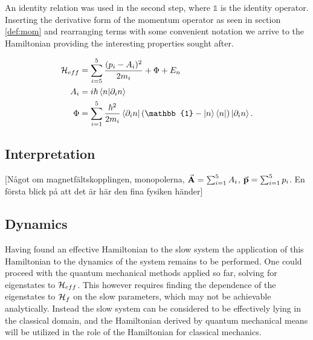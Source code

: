 \documentclass[a4paper]{article}
\begin{document}
An identity relation was used in the second step, where \(\mathbb{1}\) is the identity
operator.
Inserting the derivative form of the momentum operator as seen in section \ref{def:mom}
and rearranging terms with some convenient notation we arrive to the Hamiltonian providing the interesting properties
sought after.

\begin{align}\label{eq:Heff}
        \mathbb{\cal H}_{eff} &= \sum_{i=5}^{5} \frac{(p_i - A_i)^2}{2m_i} + \Phi + E_n\\
        A_i &= i\hbar{}\bra{n}\ket{\partial_i n}\\
        \Phi &= \sum_{i=1}^{5} \frac{\hbar{}^{2}}{2m_i}\bra{\partial_i n}(\mathbb{1} - \ket{n}
    \bra{n})\ket{\partial_i n}
.\end{align}
\subsection{Interpretation}
[Något om magnetfältskopplingen, monopolerna, \(\va{A} = \sum_{i=1}^{5} A_i\), \(\va{p} =
\sum_{i=1}^{5} p_i\). En första blick på att det är här den fina fysiken händer]
\subsection{Dynamics}
Having found an effective Hamiltonian to the slow system the application of this
Hamiltonian to the dynamics of the system remains to be performed. One could proceed with
the quantum mechanical methods applied so far, solving for eigenstates to \(\mathbb{\cal
H}_{eff}\). This however requires finding the dependence of the eigenstates to
\(\mathbb{\cal H}_f\) on the slow parameters, which may not be achievable analytically.
Instead the slow system can be considered to be effectively lying in the classical domain,
and the Hamiltonian derived by quantum mechanical means will be utilized in the role of the
Hamiltonian for classical mechanics. %
\end{document}
